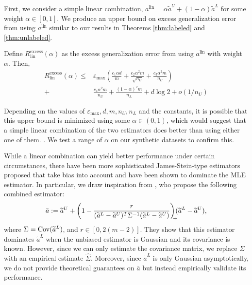 First, we consider a simple linear combination, $a^{\mathrm{lin}} = \alpha \widetilde{a}^U + (1 - \alpha) \widetilde{a}^L$ for some weight $\alpha \in [0, 1]$. We produce an upper bound on excess generalization error from using $a^{\mathrm{lin}}$ similar to our results in Theorems \ref{thm:labeled} and \ref{thm:unlabeled}.

\begin{corollary}
Define $R_{\mathrm{lin}}^{\mathrm{excess}}(\alpha)$ as the excess generalization error from using $a^{\mathrm{lin}}$ with weight $\alpha$. Then,
\begin{align}
    R_{\mathrm{lin}}^{\mathrm{excess}}(\alpha)\le & \varepsilon_{\max}\left(\frac{c_1 \alpha d }{m} + \frac{c_2 \alpha^2 m}{\sqrt{n_U}} + \frac{c_3 \alpha^2 m}{n_U} \right) \nonumber \\
    +& \frac{c_4 \alpha^2 m}{n_U} + \frac{(1 - \alpha)^2 m}{n_L} + d\log 2 + o(1/n_U) \nonumber
\end{align}
\end{corollary}

Depending on the values of $\varepsilon_{\max}, d, m, n_U, n_L$ and the constants, it is possible that this upper bound is minimized using some $\alpha \in (0, 1)$, which would suggest that a simple linear combination of the two estimators does better than using either one of them. . We test a range of $\alpha$ on our synthetic datasets to confirm this.

While a linear combination can yield better performance under certain circumstances, there have been more sophisticated James-Stein-type estimators proposed that take bias into account and have been shown to dominate the MLE estimator. In particular, we draw inspiration from \cite{GreenStrawderman1991, GreenStrawderman2001}, who propose the following combined estimator:
\begin{align}
    \bar{a} := \widetilde{a}^U + \bigg(1 - \frac{r}{(\widetilde{a}^L - \widetilde{a}^U)^T \Sigma^{-1} (\widetilde{a}^L - \widetilde{a}^U)} \bigg)_{\mathclap{+}} (\widetilde{a}^L - \widetilde{a}^U),
\end{align}
where $\Sigma = \mathrm{Cov}(\widetilde{a}^L)$, and $r \in [0, 2(m - 2)]$.  They show that this estimator dominates $\widetilde{a}^L$ when the unbiased estimator is Gaussian and its covariance is known. However, since we can only estimate the covariance matrix, we replace $\Sigma$ with an empirical estimate $\hat{\Sigma}$. Moreover, since $\widetilde{a}^L$ is only Gaussian asymptotically, we do not provide theoretical guarantees on $\bar{a}$ but instead empirically validate its performance.

